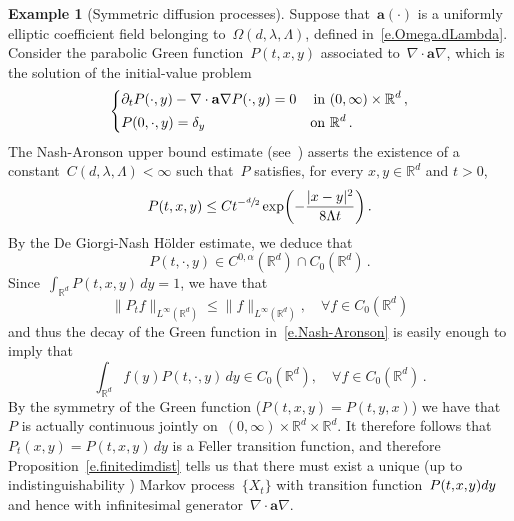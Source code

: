 \documentclass[11pt]{article} %
\numberwithin{equation}{section}
\theoremstyle{definition}
\newtheorem{example}[theorem]{Example}
\let\originalleft\left
\let\originalright\right
\renewcommand{\left}{\mathopen{}\mathclose\bgroup\originalleft}
\renewcommand{\right}{\aftergroup\egroup\originalright}
\newcommand*{\Rd}{\ensuremath{\mathbb{R}^d}}
\renewcommand{\a}{\mathbf{a}}
\begin{document}
\begin{example}[Symmetric diffusion processes]
\label{ex.symmetric.diffusion}
Suppose that~$\a(\cdot)$ is a uniformly elliptic coefficient field belonging to~$\Omega(d,\lambda,\Lambda)$, defined in~\eqref{e.Omega.dLambda}. 
Consider the parabolic Green function~$P(t,x,y)$ associated to~$\nabla \cdot \a\nabla$, which is the solution of the initial-value problem
\begin{equation*}
\left\{
\begin{aligned}
& \partial_t P(\cdot,y) - \nabla \cdot \a\nabla P(\cdot,y) = 0 & \mbox{in} & \ (0,\infty) \times \Rd\,, 
\\ & 
P(0,\cdot,y) = \delta_y & \mbox{on} & \ \Rd\,.
\end{aligned}
\right.
\end{equation*}
The Nash-Aronson upper bound estimate  (see~\cite[Lemma E.8]{AKMBook}) asserts the existence of a constant~$C(d,\lambda,\Lambda)<\infty$ such that~$P$ satisfies, for every $x,y \in\Rd$ and $t>0$, 
\begin{equation}
\label{e.Nash-Aronson}
P(t,x,y) \leq 
Ct^{-\sfrac d2} 
\exp\biggl( - \frac{ |x-y|^2 }{8\Lambda t} \biggr)
\,.
\end{equation}
By the De Giorgi-Nash H\"older estimate, we deduce that 
\begin{equation*}
P (t,\cdot,y) \in C^{0,\alpha} (\Rd) \cap C_0(\Rd)\,.
\end{equation*}
Since~$\int_{\Rd} P(t,x,y)\,dy = 1$, we have that 
\begin{equation*}
\| P_t f \|_{L^\infty(\Rd)} 
\leq 
\| f \|_{L^\infty(\Rd)}, \quad \forall f \in C_0(\Rd)
\end{equation*}
and thus the decay of the Green function in~\eqref{e.Nash-Aronson} is easily enough to imply that
\begin{equation*}
\int_{\Rd} f(y) P(t,\cdot,y)\,dy  \in C_0(\Rd), \quad \forall f \in C_0(\Rd)
\,.
\end{equation*}
By the symmetry of the Green function ($P(t,x,y) = P(t,y,x)$) we have that~$P$ is actually continuous jointly on~$(0,\infty) \times\Rd \times \Rd$.
It therefore follows that~$P_t (x,y) = P(t,x,y)\,dy$ is a Feller transition function, and therefore Proposition~\ref{e.finitedimdist} tells us that there must exist a unique (up to indistinguishability ) Markov process~$\{ X_t \}$ with transition function~$P(t,\hspace{-1pt} x, \hspace{-1pt} y)dy$ and hence with infinitesimal generator~$\nabla \cdot\a\nabla$. 


\end{example}
\end{document}
